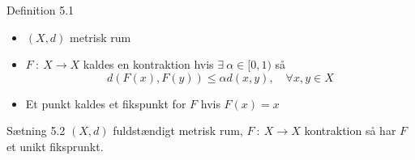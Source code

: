 \begin{boks}{Definition 5.1}
  \begin{itemize}[label = $\ast$]
    \item $(X, d)$ metrisk rum
    \item $F \ : \ X \rightarrow X$ kaldes en kontraktion hvis $\exists \ \alpha \in [0,1)$ så
    $$d(F(x), F(y)) \leq \alpha d(x,y), \quad \forall x,y \in X$$
    \item Et punkt kaldes et fikspunkt for $F$ hvis $F(x) = x$
  \end{itemize}
\end{boks}
\begin{boks}{Sætning 5.2}
  $(X,d)$ fuldstændigt metrisk rum, $F \ : \ X \rightarrow X$ kontraktion så har $F$ et unikt fiksprunkt.
\end{boks}
